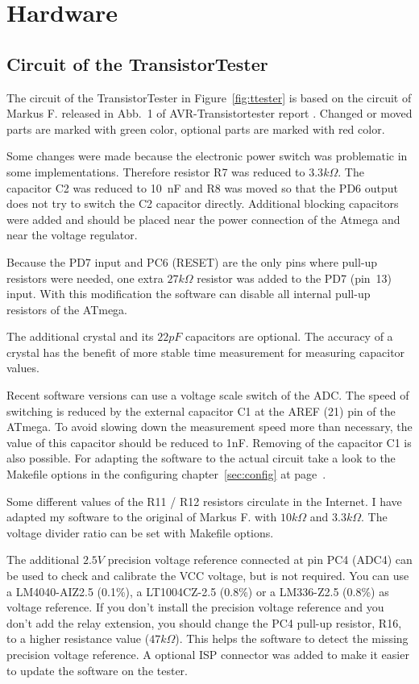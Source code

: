 \chapter{Hardware}

\section{Circuit of the TransistorTester}
\label{sec:hardware}
The circuit of the TransistorTester in Figure~\ref{fig:ttester} is based on the circuit of
 Markus F. released in Abb.~1 of AVR-Transistortester report \cite{Frejek}.
Changed or moved parts are marked with green color, optional parts are marked with red color.

Some changes were made because the electronic power switch was problematic in some implementations.
Therefore resistor R7 was reduced to \(3.3k\Omega\). The capacitor C2 was reduced to
10~nF and R8 was moved so that the PD6 output does not try to switch the C2 capacitor directly.
Additional blocking capacitors were added and should be placed
near the power connection of the Atmega and near the voltage regulator.

Because the PD7 input and PC6 (RESET) are the only pins where pull-up resistors were needed,
one extra \(27k\Omega\) resistor was added to the PD7 (pin~13) input. 
With this modification the software can disable all internal pull-up resistors of the ATmega.

The additional crystal and its \(22pF\) capacitors are optional. 
The accuracy of a crystal has the benefit of more stable time measurement for measuring 
capacitor values.

Recent software versions can use a voltage scale switch of the ADC. The speed of switching is reduced
by the external capacitor C1 at the AREF (21) pin of the ATmega. To avoid slowing down the
measurement speed more than necessary, the value of this capacitor should be reduced to 1nF.
Removing of the capacitor C1 is also possible.
For adapting the software to the actual circuit take a look to the Makefile options in the
configuring chapter~\ref{sec:config} at page~\pageref{sec:config}.

Some different values of the R11 / R12 resistors circulate in the Internet. 
I have adapted my software to the original of Markus F. \cite{Frejek} with \(10k\Omega\) and \(3.3k\Omega\).
The voltage divider ratio can be set with Makefile options.

The additional \(2.5V\) precision voltage reference connected at pin PC4 (ADC4) can be used to
check and calibrate the VCC voltage, but is not required. You can use a LM4040-AIZ2.5 (0.1\%),
a LT1004CZ-2.5 (0.8\%) or a LM336-Z2.5 (0.8\%) as voltage reference.
If you don't install the precision voltage reference and you don't add the relay extension,
you should change the PC4 pull-up resistor, R16, to a higher resistance value (\(47k\Omega\)).
This helps the software to detect the missing precision voltage reference.
A optional ISP connector was added to make it easier to update the software on the tester.

